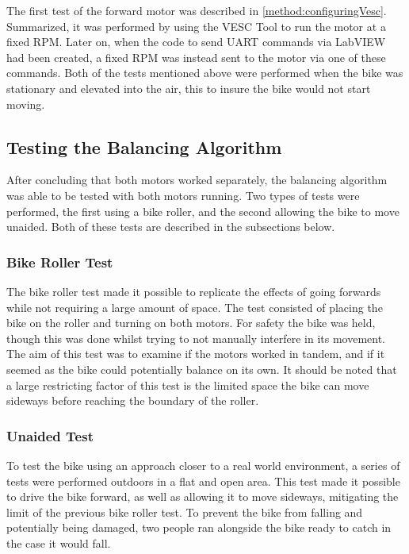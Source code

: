 The first test of the forward motor was described in \ref{method:configuringVesc}. Summarized, it was performed by using the VESC Tool to run the motor at a fixed RPM. Later on, when the code to send UART commands via LabVIEW had been created, a fixed RPM was instead sent to the motor via one of these commands. Both of the tests mentioned above were performed when the bike was stationary and elevated into the air, this to insure the bike would not start moving.

\subsection{Testing the Balancing Algorithm}

After concluding that both motors worked separately, the balancing algorithm was able to be tested with both motors running. Two types of tests were performed, the first using a bike roller, and the second allowing the bike to move unaided. Both of these tests are described in the subsections below.

\subsubsection{Bike Roller Test}

The bike roller test made it possible to replicate the effects of going forwards while not requiring a large amount of space. The test consisted of placing the bike on the roller and turning on both motors. For safety the bike was held, though this was done whilst trying to not manually interfere in its movement. The aim of this test was to examine if the motors worked in tandem, and if it seemed as the bike could potentially balance on its own. It should be noted that a large restricting factor of this test is the limited space the bike can move sideways before reaching the boundary of the roller.

\subsubsection{Unaided Test} \label{method:unaidedTest}

To test the bike using an approach closer to a real world environment, a series of tests were performed outdoors in a flat and open area. This test made it possible to drive the bike forward, as well as allowing it to move sideways, mitigating the limit of the previous bike roller test. To prevent the bike from falling and potentially being damaged, two people ran alongside the bike ready to catch in the case it would fall.


